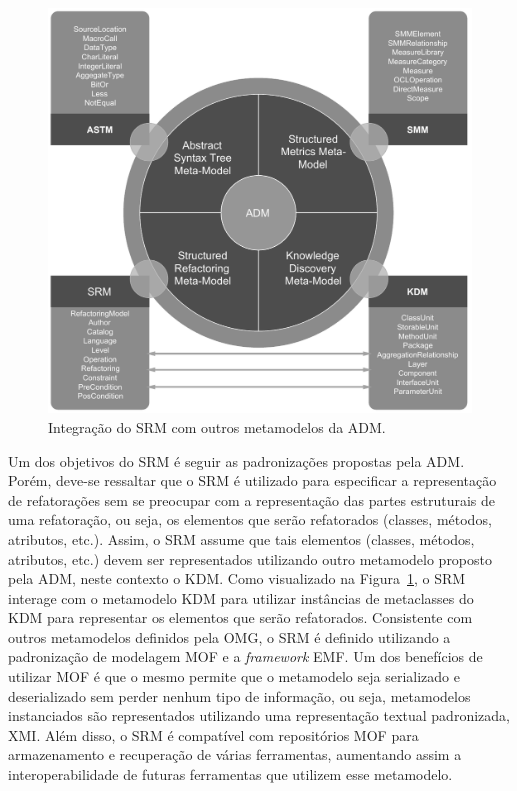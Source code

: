 \begin{figure}[h]
	\centering
	\caption{Integração do SRM com outros metamodelos da ADM.}
	\label{fig:refactoring_metamodel}
	\includegraphics[scale=0.6]{images/SRM2Formatted}
	\fautor
\end{figure}

Um dos objetivos do SRM é seguir as padronizações propostas pela ADM. Porém, deve-se ressaltar que o SRM é utilizado para especificar a representação de refatorações sem se preocupar com a representação das partes estruturais de uma refatoração, ou seja, os elementos que serão refatorados (classes, métodos, atributos, etc.). Assim, o SRM assume que tais elementos (classes, métodos, atributos, etc.) devem ser representados utilizando outro metamodelo proposto pela ADM, neste contexto o KDM. Como visualizado na Figura~\ref{fig:refactoring_metamodel}, o SRM interage com o metamodelo KDM para utilizar instâncias de metaclasses do KDM para representar os elementos que serão refatorados. Consistente com outros metamodelos definidos pela OMG, o SRM é definido utilizando a padronização de modelagem MOF e a \textit{framework} EMF. Um dos benefícios de utilizar MOF é que o mesmo permite que o metamodelo seja serializado e deserializado sem perder nenhum tipo de informação, ou seja, metamodelos instanciados são representados utilizando uma representação textual padronizada, XMI. Além disso, o SRM é compatível com repositórios MOF para armazenamento e recuperação de várias ferramentas, aumentando assim a interoperabilidade de futuras ferramentas que utilizem esse metamodelo.

